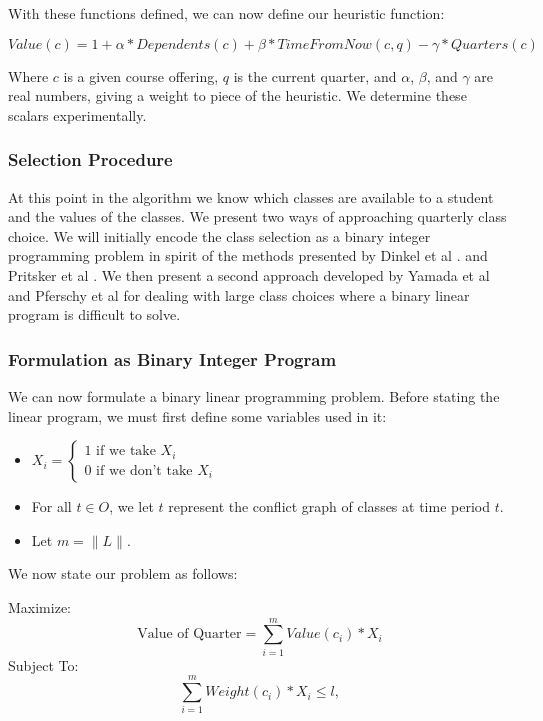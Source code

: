 \documentclass[11pt]{article} %
\begin{document}
With these functions defined, we can now define our heuristic function:

\begin{equation} 
    Value(c) = 1 + \alpha * Dependents(c) + \beta * TimeFromNow(c,q) 
    - \gamma * Quarters(c)
    \label{value_func}
\end{equation} 

Where $c$ is a given course offering, $q$ is the current quarter, and $\alpha$,
$\beta$, and $\gamma$ are real numbers, giving a weight to piece of the
heuristic. We determine these scalars experimentally.

\subsubsection{Selection Procedure} At this point in the algorithm we know which
classes are available to a student and the values of the classes. We present two
ways of approaching quarterly class choice.  We will initially encode the class
selection as a binary integer programming problem in spirit of the methods
presented by Dinkel et al \cite{dinkel:scheduling}. and Pritsker et al
\cite{prisker:informs}. We then present a second approach developed by Yamada et al
\cite{yamada:heuristic} and Pferschy et al \cite{pferschy:kcg} for
dealing with large class choices where a binary linear program is difficult to solve.

\subsubsection{Formulation as Binary Integer Program} We can now formulate
a binary linear programming problem. Before stating the linear
program, we must first define some variables used in it: 

\begin{itemize}
    \item $ X_i = \left\{ \begin{array}{lr} 1 \text{ if we take } X_i\\ 0 \text{ if
we don't take } X_i \end{array} \right. $ 
    \item For all $t \in O$, we let $t$ represent the conflict graph of classes
    at time period $t$.
    \item Let $m = \|L\|$.  
\end{itemize} 
We now state our problem as follows: 

Maximize: 
\begin{equation}
    \text{Value of Quarter} = \sum_{i=1}^m Value(c_i) * X_i
    \label{qtrval}
\end{equation}
Subject To:
\begin{equation}
    \sum_{i=1}^m Weight(c_i) * X_i \leq l, 
    \label{weightlim}
\end{equation}
\end{document}
